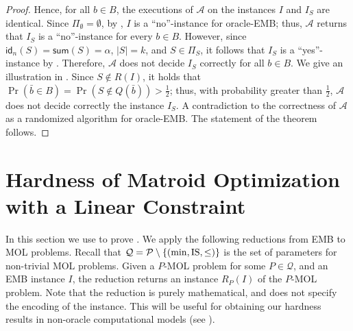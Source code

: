 \documentclass[11pt,letter]{article}
\newcommand{\IS}{\textnormal{IS}}
\newcommand{\cA}{{\mathcal{A}}}
\newcommand{\cQ}{{\mathcal{Q}}}
\newcommand{\cP}{{\mathcal{P}}}
\begin{document}
\begin{proof}
	Hence, for all $b \in B$,  the executions of $\cA$ on the instances $I$ and $I_S$ are identical.
		Since $\Pi_{\emptyset} = \emptyset$, by %
		, $I$ is a ``no''-instance for oracle-EMB; thus, $\cA$ returns that $I_S$ is a ``no''-instance for every $b\in B$. However, since $\textsf{id}_n(S) = \textsf{sum}(S) = \alpha$, $|S| = k$, and $S \in \Pi_{S}$, it follows that $I_S$ is a ``yes''-instance by .  
		Therefore, $\cA$ does not decide $I_S$ correctly for all $b \in B$.  We give an illustration in . Since  $S \notin R(I)$, it holds that $\Pr \left( \bar{b} \in B \right) = \Pr \left(S \notin Q(\bar{b}) \right) > \frac{1}{2}$; thus, with probability greater than $\frac{1}{2}$, $\cA$ does not decide correctly the instance $I_S$. 
		A contradiction to the correctness of  $\cA$  as a randomized algorithm for oracle-EMB. The statement of the theorem follows. 
	\end{proof}
	
	
	
	

	
\section{Hardness of Matroid Optimization with a Linear Constraint}
\label{sec:tight_absolute}
In this section we use  %
to prove . We apply the following reductions from EMB to MOL problems. Recall that $\cQ = \cP \setminus \{(\min,\IS,\leq)\}$ is the set of parameters for non-trivial MOL problems. Given a $P$-MOL problem for some $P \in \cQ$, and an EMB instance $I$, the reduction returns an instance $R_P(I)$ of the $P$-MOL problem. Note that the reduction is purely mathematical, and 
does not specify the encoding of the instance. This will be useful for obtaining our hardness results in non-oracle computational models (see ). 
\end{document}
